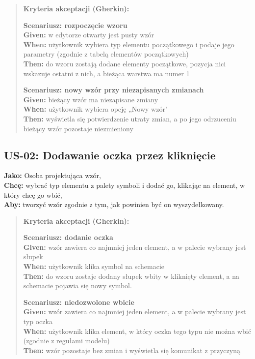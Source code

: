 \documentclass[a4paper,11pt]{article}
\begin{document}
\begin{quote}
	\textbf{Kryteria akceptacji (Gherkin):}
	
	\textbf{Scenariusz: rozpoczęcie wzoru} \\
	\textbf{Given:} w edytorze otwarty jest pusty wzór \\
	\textbf{When:} użytkownik wybiera typ elementu początkowego i podaje jego parametry (zgodnie z tabelą elementów początkowych) \\
	\textbf{Then:} do wzoru zostają dodane elementy początkowe, pozycja nici wskazuje ostatni z nich, a bieżąca warstwa ma numer 1
	
	\textbf{Scenariusz: nowy wzór przy niezapisanych zmianach} \\
	\textbf{Given:} bieżący wzór ma niezapisane zmiany \\
	\textbf{When:} użytkownik wybiera opcję „Nowy wzór" \\
	\textbf{Then:} wyświetla się potwierdzenie utraty zmian, a po jego odrzuceniu bieżący wzór pozostaje niezmieniony
\end{quote}

\subsection*{\textbf{US-02: Dodawanie oczka przez kliknięcie}}

\noindent\textbf{Jako:} Osoba projektująca wzór,\\
\noindent\textbf{Chcę:} wybrać typ elementu z palety symboli i dodać go, klikając na element, w który chcę go wbić, \\
\noindent\textbf{Aby:} tworzyć wzór zgodnie z tym, jak powinien być on wyszydełkowany.

\begin{quote}
\textbf{Kryteria akceptacji (Gherkin):}

\textbf{Scenariusz: dodanie oczka} \\
\textbf{Given:} wzór zawiera co najmniej jeden element, a w palecie wybrany jest słupek \\
\textbf{When:} użytkownik klika symbol na schemacie \\
\textbf{Then:} do wzoru zostaje dodany słupek wbity w kliknięty element, a na schemacie pojawia się nowy symbol.

\textbf{Scenariusz: niedozwolone wbicie} \\
\textbf{Given:} wzór zawiera co najmniej jeden element, a w palecie wybrany jest typ oczka \\
\textbf{When:} użytkownik klika element, w który oczka tego typu nie można wbić (zgodnie z regułami modelu) \\
\textbf{Then:} wzór pozostaje bez zmian i wyświetla się komunikat z przyczyną
\end{quote}
\end{document}
